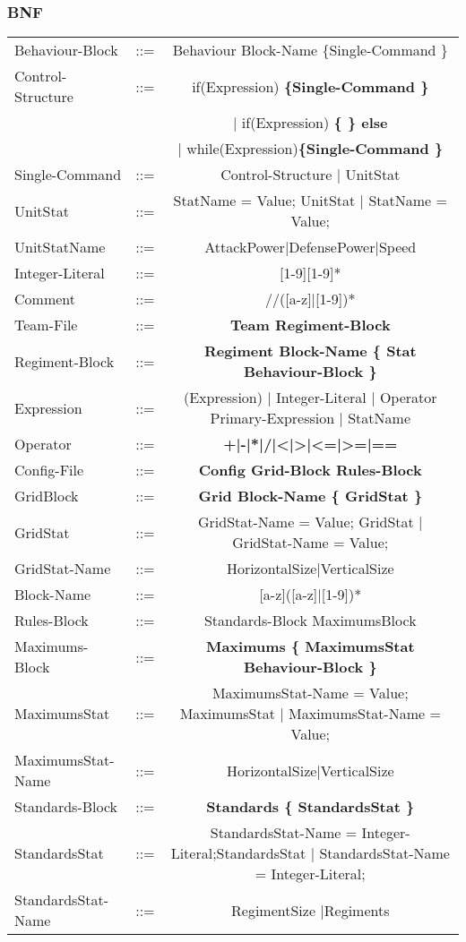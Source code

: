 	\subsubsection{BNF}
		\begin{tabular}{ l c c }
			Behaviour-Block	   &	::=	 & Behaviour Block-Name \{Single-Command \} \\
			Control-Structure  &  	::=  & if(Expression) \bf{\{}Single-Command \bf{\}}  \\
							   &		 & | if(Expression) \bf{\{} \bf{\}} else { \bf{\}}Single-Command { \bf{\}} \\
							   &   		 & | while(Expression)\bf{\{}Single-Command \bf{\}} \\
			Single-Command     &	::=  & Control-Structure | UnitStat \\
			UnitStat		   &	::=  & StatName = Value; UnitStat | StatName = Value; \\
			UnitStatName	   &	::=	 & AttackPower|DefensePower|Speed \\
			Integer-Literal    &	::=  & [1-9][1-9]* \\
			Comment			   &	::=	 & //([a-z]|[1-9])* \\
			Team-File		   &	::=	 & \bf{Team} Regiment-Block \\
			Regiment-Block     &	::=	 & \bf{Regiment} Block-Name	 \bf{\{} Stat Behaviour-Block \bf{\}}\\
			Expression		   &	::=  & (Expression) | Integer-Literal | Operator Primary-Expression | StatName \\
			Operator 		   & 	::=	 & \bf{+}|\bf{-}|\bf{*}|\bf{/}|\bf{<}|\bf{>}|\bf{<=}|\bf{>=}|\bf{==} \\
			Config-File		   & 	::=  & \bf{Config} Grid-Block Rules-Block  		\\
			GridBlock		   &	::=	 & \bf{Grid} Block-Name	 \bf{\{} GridStat \bf{\}} \\
			GridStat		   &	::=  & GridStat-Name = Value; GridStat | GridStat-Name = Value;   \\
			GridStat-Name	   &	::=  & HorizontalSize|VerticalSize					\\
			Block-Name		   &	::=  & [a-z]([a-z]|[1-9])* 							\\
			Rules-Block		   &	::=	 & Standards-Block MaximumsBlock 				\\
			Maximums-Block	   &	::=	 & \bf{Maximums} \bf{\{} MaximumsStat Behaviour-Block \bf{\}}				\\
			MaximumsStat	   &	::=  & MaximumsStat-Name = Value; MaximumsStat | MaximumsStat-Name = Value;   \\
			MaximumsStat-Name  &	::=  & HorizontalSize|VerticalSize					\\
			Standards-Block	   &    ::=  & \bf{Standards} \bf{\{} StandardsStat \bf{\}}	\\
			StandardsStat	   & 	::=	 & StandardsStat-Name = Integer-Literal;StandardsStat | StandardsStat-Name = Integer-Literal; \\
			StandardsStat-Name & 	::=	 & RegimentSize	|Regiments \\
		\end{tabular}